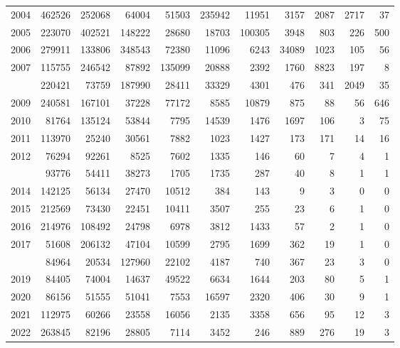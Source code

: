 \documentclass[
]{article}
\begin{document}
\begin{longtable}[t]{lrrrrrrrrrr}
2004 & 462526 & 252068 & 64004 & 51503 & 235942 & 11951 & 3157 & 2087 & 2717 & 37\\
2005 & 223070 & 402521 & 148222 & 28680 & 18703 & 100305 & 3948 & 803 & 226 & 500\\
2006 & 279911 & 133806 & 348543 & 72380 & 11096 & 6243 & 34089 & 1023 & 105 & 56\\
2007 & 115755 & 246542 & 87892 & 135099 & 20888 & 2392 & 1760 & 8823 & 197 & 8\\
\addlinespace
2008 & 220421 & 73759 & 187990 & 28411 & 33329 & 4301 & 476 & 341 & 2049 & 35\\
2009 & 240581 & 167101 & 37228 & 77172 & 8585 & 10879 & 875 & 88 & 56 & 646\\
2010 & 81764 & 135124 & 53844 & 7795 & 14539 & 1476 & 1697 & 106 & 3 & 75\\
2011 & 113970 & 25240 & 30561 & 7882 & 1023 & 1427 & 173 & 171 & 14 & 16\\
2012 & 76294 & 92261 & 8525 & 7602 & 1335 & 146 & 60 & 7 & 4 & 1\\
\addlinespace
2013 & 93776 & 54411 & 38273 & 1705 & 1735 & 287 & 40 & 8 & 1 & 1\\
2014 & 142125 & 56134 & 27470 & 10512 & 384 & 143 & 9 & 3 & 0 & 0\\
2015 & 212569 & 73430 & 22451 & 10411 & 3507 & 255 & 23 & 6 & 1 & 0\\
2016 & 214976 & 108492 & 24798 & 6978 & 3812 & 1433 & 57 & 2 & 1 & 0\\
2017 & 51608 & 206132 & 47104 & 10599 & 2795 & 1699 & 362 & 19 & 1 & 0\\
\addlinespace
2018 & 84964 & 20534 & 127960 & 22102 & 4187 & 740 & 367 & 23 & 3 & 0\\
2019 & 84405 & 74004 & 14637 & 49522 & 6634 & 1644 & 203 & 80 & 5 & 1\\
2020 & 86156 & 51555 & 51041 & 7553 & 16597 & 2320 & 406 & 30 & 9 & 1\\
2021 & 112975 & 60266 & 23558 & 16056 & 2135 & 3358 & 656 & 95 & 12 & 3\\
2022 & 263845 & 82196 & 28805 & 7114 & 3452 & 246 & 889 & 276 & 19 & 3\\*
\end{longtable}
\end{document}
